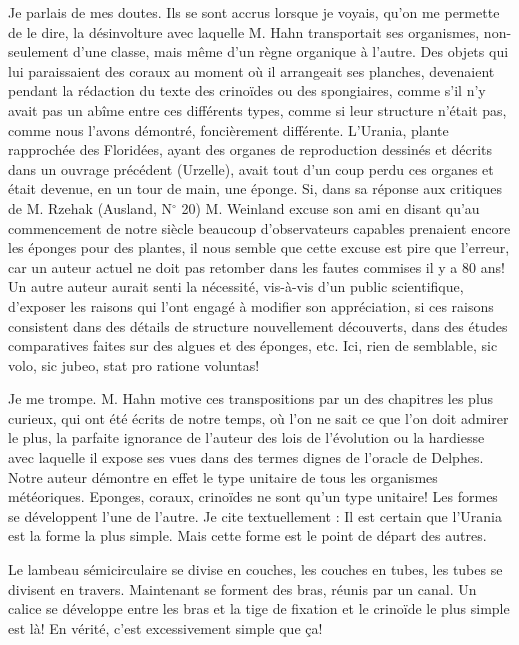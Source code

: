 \documentclass[a4paper, 12pt, oneside, french]{book}
\begin{document}
Je parlais de mes doutes. Ils se sont accrus lorsque je voyais, qu'on me permette de le dire, la désinvolture avec laquelle M. Hahn transportait ses organismes, non-seulement d'une classe, mais même d'un règne organique à l'autre. Des objets qui lui paraissaient des coraux au moment où il arrangeait ses planches, devenaient pendant la rédaction du texte des crinoïdes ou des spongiaires, comme s'il n'y avait pas un abîme entre ces différents types, comme si leur structure n'était pas, comme nous l'avons démontré, foncièrement différente. L'Urania, plante rapprochée des Floridées, ayant des organes de reproduction dessinés et décrits dans un ouvrage précédent (Urzelle), avait tout d'un coup perdu ces organes et était devenue, en un tour de main, une éponge. Si, dans sa réponse aux critiques de M. Rzehak (Ausland, N$^{\circ}$ 20) M. Weinland excuse son ami en disant \og qu'au commencement de notre siècle \og beaucoup d'observateurs capables prenaient encore les éponges pour des plantes, \fg il nous semble que cette excuse est pire que l'erreur, car un auteur actuel ne doit pas retomber dans les fautes commises il y a 80 ans! Un autre auteur aurait senti la nécessité, vis-à-vis d'un public scientifique, d'exposer les raisons qui l'ont engagé à modifier son appréciation, si ces raisons consistent dans des détails de structure nouvellement découverts, dans des études comparatives faites sur des algues et des éponges, etc. Ici, rien de semblable, sic volo, sic jubeo, stat pro ratione voluntas!

Je me trompe. M. Hahn motive ces transpositions par un des chapitres les plus curieux, qui ont été écrits de notre temps, où l'on ne sait ce que l'on doit admirer le plus, la parfaite ignorance de l'auteur des lois de l'évolution ou la hardiesse avec laquelle il expose ses vues dans des termes dignes de l'oracle de Delphes. Notre auteur démontre en effet \og le type unitaire de tous les organismes météoriques. \fg Eponges, coraux, crinoïdes ne sont qu'un type unitaire! Les formes se développent l'une de l'autre. Je cite textuellement : \og Il est certain que l'Urania est la forme la plus simple. Mais cette forme est le point de départ des autres. \fg

\og Le lambeau sémicirculaire se divise en couches, les couches en tubes, les tubes se divisent en travers. Maintenant se forment des bras, réunis par un canal. Un calice se développe entre les bras et la tige de fixation et le crinoïde le plus simple est là! \fg En vérité, c'est excessivement simple que ça!
\end{document}
